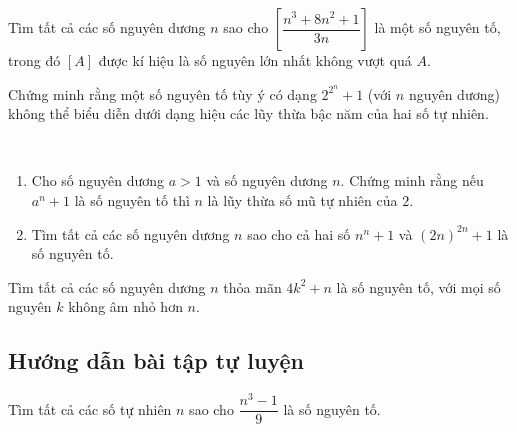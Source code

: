 \begin{btt}
Tìm tất cả các số nguyên dương ${n}$ sao cho $\left[\dfrac{{n}^{3}+8 {n}^{2}+1}{3 {n}}\right]$ là một số nguyên tố, trong đó $[A]$ được kí hiệu là số nguyên lớn nhất không vượt quá $A.$ 
\end{btt}

\begin{btt}
Chứng minh rằng một số nguyên tố tùy ý có dạng $2^{2^n}+1$ (với $n$ nguyên dương) không thể biểu diễn dưới dạng hiệu các lũy thừa bậc năm của hai số tự nhiên.
\end{btt}

\begin{btt} \
\begin{enumerate}[a,]
    \item Cho số nguyên dương $a>1$ và số nguyên dương $n.$ Chứng minh rằng nếu $a^n+1$ là số nguyên tố thì $n$ là lũy thừa số mũ tự nhiên của $2.$
    \item Tìm tất cả các số nguyên dương $n$ sao cho cả hai số $n^n+1$ và $(2n)^{2n}+1$ là số nguyên tố.
\end{enumerate}
\end{btt}

\begin{btt}
Tìm tất cả các số nguyên dương \(n\) thỏa mãn \(4k^2+n\) là số nguyên tố, với mọi số nguyên \(k\) không âm nhỏ hơn \(n\).
\nguon{Tạp chí Kvant}
\end{btt}

\subsection{Hướng dẫn bài tập tự luyện}

\begin{gbtt}
Tìm tất cả các số tự nhiên $n$ sao cho $\dfrac{n^3 - 1}{9}$ là số nguyên tố.
\end{gbtt}

